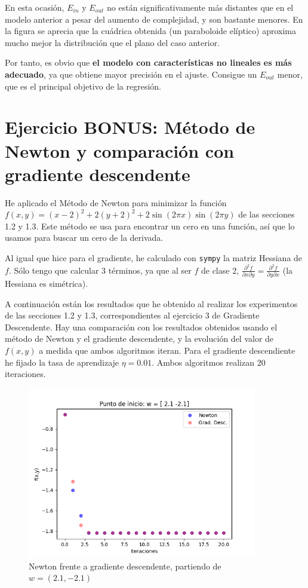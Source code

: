\documentclass[a4]{article}
\begin{document}
En esta ocasión, $E_{in}$ y $E_{out}$ no están significativamente más distantes
que en el modelo anterior a pesar del aumento de complejidad, y son bastante
menores. En la figura se aprecia que la cuádrica obtenida (un paraboloide elíptico) aproxima mucho mejor la distribución que el plano del caso anterior.

Por tanto, es obvio que \textbf{el modelo con características no lineales es más adecuado},
ya que obtiene mayor precisión en el ajuste. Consigue un $E_{out}$ menor, que
es el principal objetivo de la regresión.


\section{Ejercicio BONUS: Método de Newton y comparación con gradiente descendente}

He aplicado el Método de Newton para minimizar la función \\
$f(x,y)=(x-2)^2+2(y+2)^2+2\sin(2\pi x)\sin(2\pi y)$ de las secciones 1.2 y 1.3. Este método se usa para encontrar un cero en una función,
así que lo usamos para buscar un cero de la derivada.

Al igual que hice para el gradiente, he calculado con \texttt{sympy} la matriz
Hessiana de $f$. Sólo tengo que calcular 3 términos, ya que al ser $f$ de clase
2, $\frac{\partial^2 f}{\partial x\partial y}=\frac{\partial^2 f}{\partial y\partial x}$ (la Hessiana es simétrica).

A continuación están los resultados que he obtenido al realizar los experimentos
de las secciones 1.2 y 1.3, correspondientes al ejercicio 3 de Gradiente
Descendente. Hay una comparación con los resultados obtenidos usando el método de Newton y
el gradiente descendente, y la evolución del valor de $f(x,y)$ a medida que ambos algoritmos iteran.
Para el gradiente descendiente he fijado la tasa de aprendizaje $\eta=0.01$.
Ambos algoritmos realizan 20 iteraciones.

\begin{figure}[H]
    \centering    
    \includegraphics[width=100mm]{imgs/newton-grad_1.png}
    \caption{Newton frente a gradiente descendente, partiendo de $w=(2.1,-2.1)$}
    \label{fig:newton-grad_1}
\end{figure}
\end{document}
